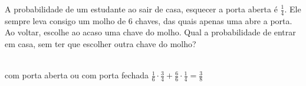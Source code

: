 \begin{ex}
	A probabilidade de um estudante ao sair de casa, esquecer a porta aberta é $\frac{1}{4}$. Ele sempre leva consigo um molho de 6 chaves, das quais apenas uma abre a porta. Ao voltar, escolhe ao acaso uma chave do molho. Qual a probabilidade de entrar em casa, sem ter que escolher outra chave do molho?
	  \begin{sol}
	    \phantom{A} \\
	    com porta aberta  ou  com porta fechada
	    $\frac{1}{6}\cdot\frac{3}{4}+\frac{6}{6}\cdot\frac{1}{4}=\frac{3}{8}$
	  \end{sol}
\end{ex}